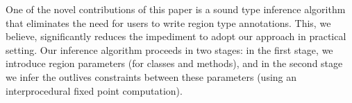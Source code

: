 One of the novel contributions of this paper is a sound type inference algorithm
that eliminates the need for users to write region type annotations.
This, we believe, significantly reduces the impediment to adopt our
approach in practical setting.
Our inference algorithm proceeds in two stages: in the first stage,
we introduce region parameters (for classes and methods), and in
the second stage we infer the outlives constraints between these
parameters (using an interprocedural fixed point computation).





